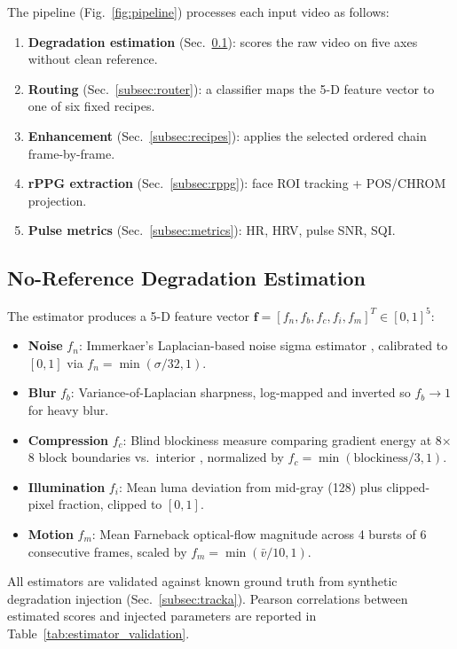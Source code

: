 \documentclass[conference]{IEEEtran}
\begin{document}
The pipeline (Fig.~\ref{fig:pipeline}) processes each input video as follows:

\begin{enumerate}
    \item \textbf{Degradation estimation} (Sec.~\ref{subsec:estimator}): scores the raw video on five axes without clean reference.
    \item \textbf{Routing} (Sec.~\ref{subsec:router}): a classifier maps the 5-D feature vector to one of six fixed recipes.
    \item \textbf{Enhancement} (Sec.~\ref{subsec:recipes}): applies the selected ordered chain frame-by-frame.
    \item \textbf{rPPG extraction} (Sec.~\ref{subsec:rppg}): face ROI tracking + POS/CHROM projection.
    \item \textbf{Pulse metrics} (Sec.~\ref{subsec:metrics}): HR, HRV, pulse SNR, SQI.
\end{enumerate}

\subsection{No-Reference Degradation Estimation}
\label{subsec:estimator}

The estimator produces a 5-D feature vector $\mathbf{f} = [f_n, f_b, f_c, f_i, f_m]^T \in [0,1]^5$:

\begin{itemize}
    \item \textbf{Noise} $f_n$: Immerkaer's Laplacian-based noise sigma estimator \cite{immerkaer1996fast}, calibrated to $[0,1]$ via $f_n = \min(\sigma / 32, 1)$.
    \item \textbf{Blur} $f_b$: Variance-of-Laplacian sharpness, log-mapped and inverted so $f_b \rightarrow 1$ for heavy blur.
    \item \textbf{Compression} $f_c$: Blind blockiness measure comparing gradient energy at 8$\times$8 block boundaries vs.\ interior \cite{wang2000blind}, normalized by $f_c = \min(\text{blockiness}/3, 1)$.
    \item \textbf{Illumination} $f_i$: Mean luma deviation from mid-gray (128) plus clipped-pixel fraction, clipped to $[0,1]$.
    \item \textbf{Motion} $f_m$: Mean Farneback optical-flow magnitude across 4 bursts of 6 consecutive frames, scaled by $f_m = \min(\bar{v} / 10, 1)$.
\end{itemize}

All estimators are validated against known ground truth from synthetic degradation injection (Sec.~\ref{subsec:tracka}). Pearson correlations between estimated scores and injected parameters are reported in Table~\ref{tab:estimator_validation}.
\end{document}
